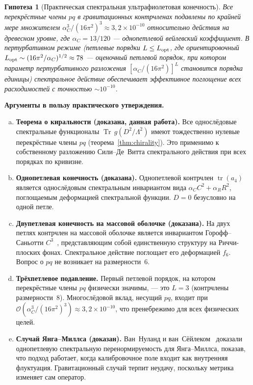 \documentclass[12pt,a4paper]{article}
\newtheorem{conjecture}[theorem]{Гипотеза}
\theoremstyle{definition}
\theoremstyle{remark}
\newcommand{\Tr}{\operatorname{Tr}}
\newcommand{\tr}{\operatorname{tr}}
\newcommand{\Lam}{\Lambda}
\newcommand{\order}{\mathcal{O}}
\begin{document}
\begin{conjecture}[Практическая спектральная ультрафиолетовая конечность]
\label{conj:practical}
Все перекрёстные члены $pq$ в гравитационных контрчленах подавлены по
крайней мере множителем
$\alpha_C^3/(16\pi^2)^3 \approx 3{,}2 \times 10^{-10}$ относительно
действия на древесном уровне, где $\alpha_C = 13/120$ --- однопетлевой
вейлевский коэффициент.  В пертурбативном режиме (петлевые порядки
$L \leq L_{\rm opt}$, где ориентировочный $L_{\rm opt} \sim (16\pi^2/\alpha_C)^{1/2}
\approx 78$ --- оценочный петлевой порядок, при котором параметр пертурбативного
разложения $[\alpha_C/(16\pi^2)]^L$ становится порядка единицы)
спектральное действие обеспечивает эффективное поглощение всех
расходимостей с точностью $\sim 10^{-10}$.
\end{conjecture}

\noindent\textbf{Аргументы в пользу практического утверждения.}
\begin{enumerate}[(a)]
  \item \textbf{Теорема о киральности (доказана, данная работа).}
    Все однослёдовые спектральные функционалы $\Tr\,g(D^2/\Lam^2)$ имеют
    тождественно нулевые перекрёстные члены $pq$
    (теорема~\ref{thm:chirality}).  Это применимо к собственному разложению
    Сили--Де~Витта спектрального действия при всех порядках по кривизне.

  \item \textbf{Однопетлевая конечность (доказана).}
    Однопетлевой контрчлен $\tr(a_4)$ является однослёдовым спектральным
    инвариантом вида $\alpha_C C^2 + \alpha_R R^2$, поглощаемым деформацией
    спектральной функции.  $D = 0$ безусловно на одной петле.

  \item \textbf{Двупетлевая конечность на массовой оболочке (доказана).}
    На двух петлях контрчлен на массовой оболочке является инвариантом
    Горофф--Саньотти $C^3$~\cite{Goroff:1985th,vandeVen:1992gw},
    представляющим собой единственную структуру на Риччи-плоских фонах.
    Спектральное действие поглощает его деформацией $f_6$.
    Вопрос о $pq$ не возникает на размерности~6.

  \item \textbf{Трёхпетлевое подавление.}
    Первый петлевой порядок, на котором перекрёстные члены $pq$ физически
    значимы, --- это $L = 3$ (контрчлены размерности~8).
    Многослёдовой вклад, несущий $pq$, входит при
    $\order(\alpha_C^3/(16\pi^2)^3) \approx 3{,}2 \times 10^{-10}$, что
    пренебрежимо для всех физических целей.

  \item \textbf{Случай Янга--Миллса (доказан).}
    Ван~Нуланд и ван~Сёйлеком~\cite{vanNuland:2021} доказали однопетлевую
    спектральную перенормируемость для Янга--Миллса, показав, что подход
    работает, когда калибровочное поле входит как внутренняя флуктуация.
    Гравитационный случай терпит неудачу, поскольку метрика изменяет сам
    оператор.
\end{enumerate}
\end{document}
